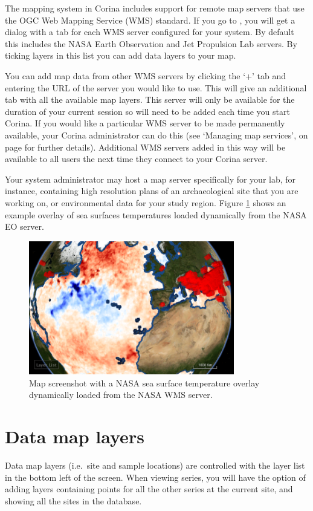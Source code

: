 The mapping system in Corina includes support for remote map servers that use the OGC Web Mapping Service (WMS) standard. If you go to , you will get a dialog with a tab for each WMS server configured for your system. By default this includes the NASA Earth Observation and Jet Propulsion Lab servers.  By ticking layers in this list you can add data layers to your map.

You can add map data from other WMS servers by clicking the `+' tab and entering the URL of the server you would like to use.  This will give an additional tab with all the available map layers.  This server will only be available for the duration of your current session so will need to be added each time you start Corina.  If you would like a particular WMS server to be made permanently available, your Corina administrator can do this (see `Managing map services', on page \pageref{txt:managingmaps} for further details).  Additional WMS servers added in this way will be available to all users the next time they connect to your Corina server.

Your system administrator may host a map server specifically for your lab, for instance, containing high resolution plans of an archaeological site that you are working on, or environmental data for your study region. Figure \ref{fig:wms} shows an example overlay of sea surfaces temperatures loaded dynamically from the NASA EO server.

\begin{figure}[hbtp]
  \centering
  \includegraphics[width=0.8\textwidth]{Images/sst.png}
  \caption{Map screenshot with a NASA sea surface temperature overlay dynamically loaded from the NASA WMS server.}
  \label{fig:wms}
\end{figure}




\section{Data map layers}
Data map layers (i.e.\ site and sample locations) are controlled with the layer list in the bottom left of the screen. When viewing series, you will have the option of adding layers containing points for all the other series at the current site, and showing all the sites in the database. 


